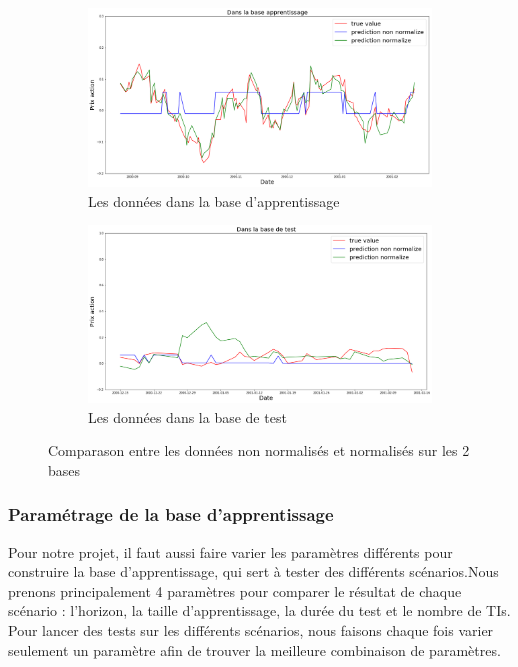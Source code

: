 \begin{figure}[H]
\centering
	\begin{subfigure}{.5\textwidth}
	\centering
	\includegraphics[width=.9\linewidth, scale=0.2]
	{plot/norma.png}
	\caption{Les données dans la base d'apprentissage}
	\label{fig:Base_A}
	\end{subfigure}%
	\begin{subfigure}{.5\textwidth}
	\centering
	\includegraphics[width=.9\linewidth, scale=0.2]
	{plot/non_norma.png}
	\caption{Les données dans la base de test}
	\label{fig:Base_T}
	\end{subfigure}
\caption{Comparason entre les données non normalisés et normalisés sur les 2 bases}
\label{fig: normalisation}
\end{figure}

\subsubsection{Paramétrage de la base d'apprentissage}

Pour notre projet, il faut aussi faire varier les paramètres différents pour construire la base d'apprentissage, qui sert à tester des différents scénarios.Nous prenons principalement 4 paramètres pour comparer le résultat de chaque scénario : l'horizon, la taille d'apprentissage, la durée du test et le nombre de TIs. Pour lancer des tests sur les différents scénarios, nous faisons chaque fois varier seulement un paramètre afin de trouver la meilleure combinaison de paramètres.\\

